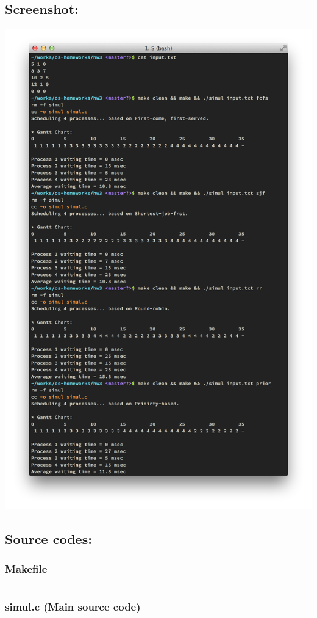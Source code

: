 \documentclass[a4paper,11pt]{article}
\begin{document}
\subsection*{Screenshot:}
    \includegraphics[width=\textwidth]{screenshot.png}

\subsection*{Source codes:}

\subsubsection*{Makefile}
\inputminted[fontsize=\footnotesize,linenos]{basemake}{Makefile}

\subsubsection*{simul.c (Main source code)}
\inputminted[fontsize=\footnotesize,linenos]{c}{simul.c}
\end{document}
